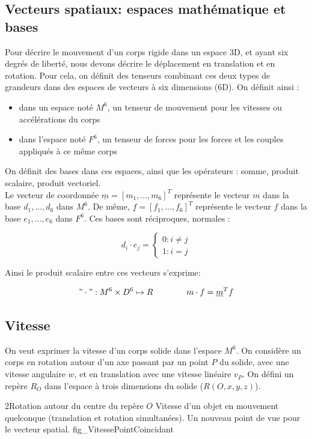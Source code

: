 \documentclass{report}
\begin{document}
\subsection{Vecteurs spatiaux: espaces mathématique et bases}

Pour décrire le mouvement d'un corps rigide dans un espace 3D, et ayant six degrés de liberté, nous devons décrire le déplacement en translation et en rotation. Pour cela, on définit des tenseurs combinant ces deux types de grandeurs dans des espaces de vecteurs à six dimensions (6D). On définit ainsi :\\
\begin{itemize}
\item dans un espace noté $M^{6}$, un tenseur de mouvement pour les vitesses ou accélérations du corps
\item dans l'espace noté $F^{6}$, un tenseur de forces pour les forces et les couples appliqués à ce même corps
\end{itemize}
On définit des bases dans ces espaces, ainsi que les opérateurs : somme, produit scalaire, produit vectoriel.\\
Le vecteur de coordonnée $\underline{m}=[m_{1},...,m_{6}]^T$ représente le vecteur $m$ dans la base ${d_{1},...,d_{6}}$ dans $M^{6}$.
De même, $\underline{f}=[f_{1},...,f_{6}]^T$ représente le vecteur $f$ dans la base ${e_{1},...,e_{6}}$ dans $F^{6}$.
Ces bases sont réciproques, normales :

$$
d_{i}\cdot e_{j}=
\begin{cases}
0 \colon i \neq j\\
1 \colon i = j
\end{cases}
$$

Ainsi le produit scalaire entre ces vecteurs s'exprime:

$$
"\cdot" : M^{6} \times D^{6} \mapsto R
\qquad
\qquad
m \cdot f = \underline{m}^T f
$$

\subsection{Vitesse}\label{ch_algSpa_Vitesse}

On veut exprimer la vitesse d'un corps solide dans l'espace $M^{6}$. On considère un corps en rotation autour d'un axe passant par un point $P$ du solide, avec une vitesse angulaire $w$, et en translation avec une vitesse linéaire $v_{P}$. On défini un repère $R_{O}$ dans l'espace à trois dimensions du solide ($R(O,x,y,z)$).

{2}{Rotation autour du centre du repère $O$}
{Vitesse d'un objet en mouvement quelconque (translation et rotation simultanées). Un nouveau point de vue pour le vecteur spatial.}
{fig_VitessePointCoincidant}
\end{document}
